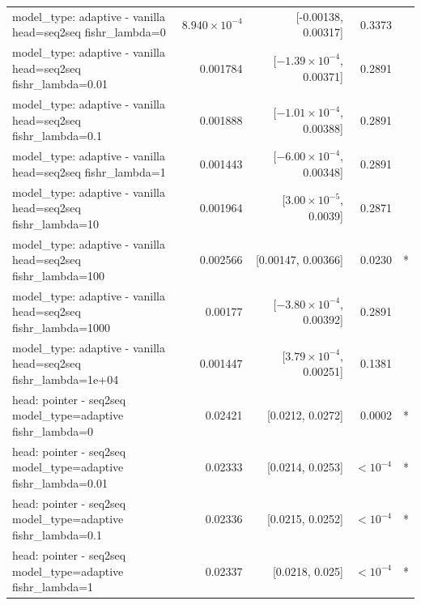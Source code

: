 \documentclass[10pt]{article}
\makeatletter
\newcommand{\stackcell}[1]{\begin{tabular}[t]{@{}l@{}}#1\end{tabular}}
\makeatother
\begin{document}
{\begin{longtable}{lrrrl}
\stackcell{model\_type: adaptive - vanilla\\\footnotesize head=seq2seq fishr\_lambda=0 } & $8.940\times10^{-4}$ & [-0.00138, 0.00317] & 0.3373 & \\
\stackcell{model\_type: adaptive - vanilla\\\footnotesize head=seq2seq fishr\_lambda=0.01 } & 0.001784 & [$-1.39\times10^{-4}$, 0.00371] & 0.2891 & \\
\stackcell{model\_type: adaptive - vanilla\\\footnotesize head=seq2seq fishr\_lambda=0.1 } & 0.001888 & [$-1.01\times10^{-4}$, 0.00388] & 0.2891 & \\
\stackcell{model\_type: adaptive - vanilla\\\footnotesize head=seq2seq fishr\_lambda=1 } & 0.001443 & [$-6.00\times10^{-4}$, 0.00348] & 0.2891 & \\
\stackcell{model\_type: adaptive - vanilla\\\footnotesize head=seq2seq fishr\_lambda=10 } & 0.001964 & [$3.00\times10^{-5}$, 0.0039] & 0.2871 & \\
\stackcell{model\_type: adaptive - vanilla\\\footnotesize head=seq2seq fishr\_lambda=100 } & 0.002566 & [0.00147, 0.00366] & 0.0230 & *\\
\stackcell{model\_type: adaptive - vanilla\\\footnotesize head=seq2seq fishr\_lambda=1000 } & 0.00177 & [$-3.80\times10^{-4}$, 0.00392] & 0.2891 & \\
\stackcell{model\_type: adaptive - vanilla\\\footnotesize head=seq2seq fishr\_lambda=1e+04 } & 0.001447 & [$3.79\times10^{-4}$, 0.00251] & 0.1381 & \\
\stackcell{head: pointer - seq2seq\\\footnotesize model\_type=adaptive fishr\_lambda=0 } & 0.02421 & [0.0212, 0.0272] & 0.0002 & *\\
\stackcell{head: pointer - seq2seq\\\footnotesize model\_type=adaptive fishr\_lambda=0.01 } & 0.02333 & [0.0214, 0.0253] & $<10^{-4}$ & *\\
\stackcell{head: pointer - seq2seq\\\footnotesize model\_type=adaptive fishr\_lambda=0.1 } & 0.02336 & [0.0215, 0.0252] & $<10^{-4}$ & *\\
\stackcell{head: pointer - seq2seq\\\footnotesize model\_type=adaptive fishr\_lambda=1 } & 0.02337 & [0.0218, 0.025] & $<10^{-4}$ & *\\

\end{longtable}}
\end{document}
